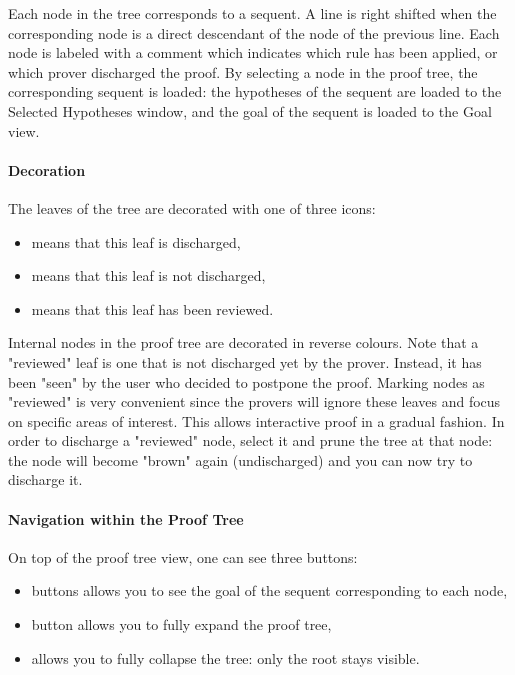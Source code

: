 Each node in the tree corresponds to a sequent. A line is right shifted when the corresponding node is a direct descendant of the node of the previous line. Each node is labeled with a comment which indicates which rule has been applied, or which prover discharged the proof. By selecting a node in the proof tree, the corresponding sequent is loaded: the hypotheses of the sequent are loaded to the \textsf{Selected Hypotheses window}, and the goal of the sequent is loaded to the \textsf{Goal view}.

\paragraph{Decoration}

The leaves of the tree are decorated with one of three icons:

\begin{itemize}
	\item {} means that this leaf is discharged,
	\item {} means that this leaf is not discharged,
	\item {} means that this leaf has been reviewed. 
\end{itemize}

Internal nodes in the proof tree are decorated in reverse colours. Note that a "reviewed" leaf is one that is not discharged yet by the prover. Instead, it has been "seen" by the user who decided to postpone the proof. Marking nodes as "reviewed" is very convenient since the provers will ignore these leaves and focus on specific areas of interest. This allows interactive proof in a gradual fashion. In order to discharge a "reviewed" node, select it and prune the tree at that node: the node will become "brown" again (undischarged) and you can now try to discharge it. 

\paragraph{Navigation within the Proof Tree}

On top of the proof tree view, one can see three buttons:

\begin{itemize}
	\item {} buttons allows you to see the goal of the sequent corresponding to each node,
	\item {} button allows you to fully expand the proof tree,
	\item {} allows you to fully collapse the tree: only the root stays visible. 
\end{itemize}

